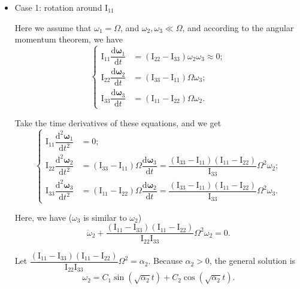 \begin{itemize}
\tightlist{}
\item
  Case 1: rotation around \(\mathrm I_{11}\)

  Here we assume that \(\omega_1 = \Omega\), and
  \(\omega_2, \omega_3 \ll \Omega\), and according to the angular
  momentum theorem, we have \[\left\{
        \begin{aligned}
            \mathrm I_{11} \dfrac{\mathrm d \boldsymbol \omega_1}{\mathrm dt} & = (\mathrm I_{22} - \mathrm I_{33}) \omega_2 \omega_3 \approx 0; \\
            \mathrm I_{22} \dfrac{\mathrm d \boldsymbol \omega_2}{\mathrm dt} & = (\mathrm I_{33} - \mathrm I_{11}) \Omega \omega_3; \\
            \mathrm I_{33} \dfrac{\mathrm d \boldsymbol \omega_3}{\mathrm dt} & = (\mathrm I_{11} - \mathrm I_{22}) \Omega \omega_2.
        \end{aligned}
    \right.\]

  Take the time derivatives of these equations, and we get \[\left\{
        \begin{aligned}
            \mathrm I_{11} \dfrac{\mathrm d^2 \boldsymbol \omega_1}{\mathrm dt^2} & = 0; \\
            \mathrm I_{22} \dfrac{\mathrm d^2 \boldsymbol \omega_2}{\mathrm dt^2} & = (\mathrm I_{33} - \mathrm I_{11}) \Omega \dfrac{\mathrm d \boldsymbol \omega_3}{\mathrm dt} = \dfrac{(\mathrm I_{33} - \mathrm I_{11})(\mathrm I_{11} - \mathrm I_{22})}{\mathrm I_{33}} \Omega^2 \omega_2; \\
            \mathrm I_{33} \dfrac{\mathrm d^2 \boldsymbol \omega_3}{\mathrm dt^2} & = (\mathrm I_{11} - \mathrm I_{22}) \Omega \dfrac{\mathrm d \boldsymbol \omega_2}{\mathrm dt} = \dfrac{(\mathrm I_{33} - \mathrm I_{11})(\mathrm I_{11} - \mathrm I_{22})}{\mathrm I_{33}} \Omega^2 \omega_3.
        \end{aligned}
    \right.\]

  Here, we have (\(\omega_3\) is similar to \(\omega_2\))
  \[\ddot{\omega}_2 + \dfrac{(\mathrm I_{11} - \mathrm I_{33})(\mathrm I_{11} - \mathrm I_{22})}{\mathrm I_{22} \mathrm I_{33}} \Omega^2 \omega_2 = 0.\]

  Let \(\dfrac{(\mathrm I_{11} - \mathrm I_{33})(\mathrm I_{11} - \mathrm I_{22})}{\mathrm I_{22} \mathrm I_{33}} \Omega^2= \alpha_2\). Because \(\alpha_2 > 0\), the general solution is \[\omega_2 = C_1 \sin \left( \sqrt{\alpha_2}t \right) + C_2 \cos \left( \sqrt{\alpha_2}t \right).\]


\end{itemize}
